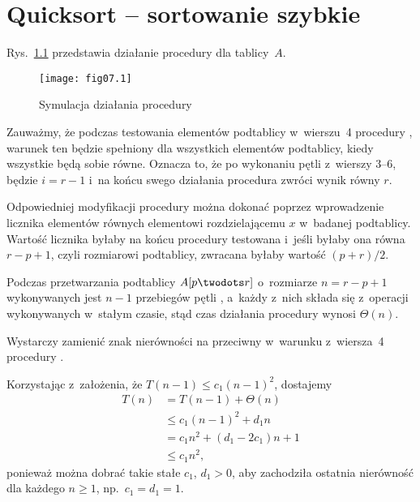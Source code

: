 \chapter{Quicksort -- sortowanie szybkie}


\exercise %
Rys.~\ref{fig:7.1-1} przedstawia działanie procedury  dla tablicy~$A$.
\begin{figure}[ht]
	\begin{center}
		\texttt{[image: fig07.1]}
	\end{center}
	\caption{Symulacja działania procedury } \label{fig:7.1-1}
\end{figure}

\exercise %
Zauważmy, że podczas testowania elementów podtablicy w~wierszu~4 procedury , warunek ten będzie spełniony dla wszystkich elementów podtablicy, kiedy wszystkie będą sobie równe. Oznacza to, że po wykonaniu pętli  z~wierszy 3\nobreakdash--6, będzie $i=r-1$ i~na końcu swego działania procedura zwróci wynik równy $r$.

Odpowiedniej modyfikacji procedury można dokonać poprzez wprowadzenie licznika elementów równych elementowi rozdzielającemu $x$ w~badanej podtablicy. Wartość licznika byłaby na końcu procedury testowana i~jeśli byłaby ona równa $r-p+1$, czyli rozmiarowi podtablicy, zwracana byłaby wartość $(p+r)/2$.

\exercise %
Podczas przetwarzania podtablicy $A[p\twodots r]$ o~rozmiarze $n=r-p+1$ wykonywanych jest $n-1$ przebiegów pętli , a~każdy z~nich składa się z~operacji wykonywanych w~stałym czasie, stąd czas działania procedury wynosi $\Theta(n)$.

\exercise %
Wystarczy zamienić znak nierówności na przeciwny w~warunku z~wiersza~4 procedury .


\exercise %
Korzystając z~założenia, że $T(n-1)\le c_1(n-1)^2$, dostajemy
\begin{align*}
	T(n) &= T(n-1)+\Theta(n) \\
	&\le c_1(n-1)^2+d_1n \\
	&= c_1n^2+(d_1-2c_1)n+1 \\
	&\le c_1n^2,
\end{align*}
ponieważ można dobrać takie stałe $c_1$, $d_1>0$, aby zachodziła ostatnia nierówność dla każdego $n\ge1$, np.\ $c_1=d_1=1$.

